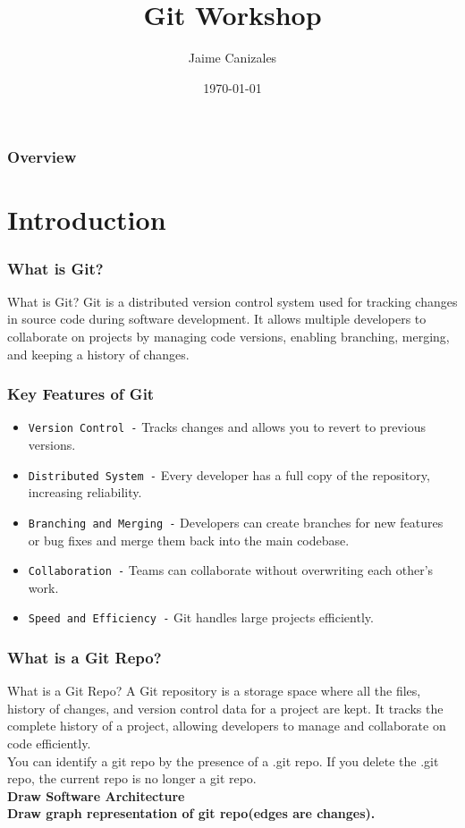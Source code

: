 \documentclass{beamer}
\title[Git Workshop]{Git Workshop}
\author{Jaime Canizales}
\institute[Hunter College] 
{
City University of New York \\ 
\medskip
\textit{jaime.canizales@hunter.cuny.edu} 
}
\date{\today}
\begin{document}
\begin{frame}
\titlepage 
\end{frame}


\begin{frame} \frametitle{Overview} 
\tableofcontents
\end{frame}


\section{Introduction}
\begin{frame}\frametitle{What is Git?}
\begin{block}{What is Git?}
Git is a distributed version control system used for tracking changes in source
code during software development. It allows multiple developers to collaborate
on projects by managing code versions, enabling branching, merging, and keeping
a history of changes. 
\end{block}
\end{frame}


\begin{frame}\frametitle{Key Features of Git}
\begin{itemize}
\item  \texttt{Version Control -} Tracks changes and allows you to revert to previous versions.
\item  \texttt{Distributed System -} Every developer has a full copy of the repository, increasing reliability.
\item  \texttt{Branching and Merging -} Developers can create branches for new features or bug fixes and merge them back into the main codebase.
\item  \texttt{Collaboration -} Teams can collaborate without overwriting each other's work.
\item  \texttt{Speed and Efficiency -} Git handles large projects efficiently. 
\end{itemize}
\end{frame}
    

\begin{frame}\frametitle{What is a Git Repo?}
\begin{block}{What is a Git Repo?}
A Git repository is a storage space where all the files, history of changes, 
and version control data for a project are kept. It tracks the complete history
of a project, allowing developers to manage and collaborate on code efficiently.\\
You can identify a git repo by the presence of a .git repo. If you delete the
.git repo, the current repo is no longer a git repo.\\
\textbf{Draw Software Architecture}\\
\textbf{Draw graph representation of git repo(edges are changes).}\\
\end{block}
\end{frame}
\end{document}
